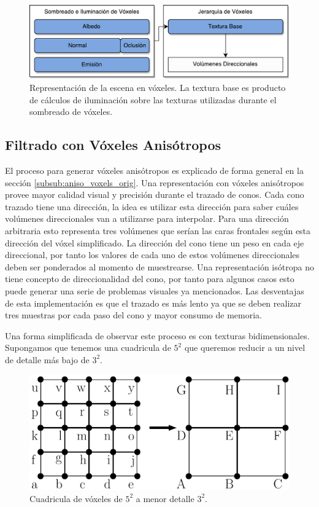 \begin{figure}[H]
    \centering
    \includegraphics[width=.8\linewidth]{media/representation.pdf}
    \caption{Representación de la escena en vóxeles. La textura base es producto de cálculos de iluminación sobre las texturas utilizadas durante el sombreado de vóxeles.}
\end{figure}
\subsection{Filtrado con Vóxeles Anisótropos} %
\label{sub:voxeles_anisotropos}
El proceso para generar vóxeles anisótropos es explicado de forma general en la sección \ref{subsub:aniso_voxels_orig}. Una representación con vóxeles anisótropos provee mayor calidad visual y precisión durante el trazado de conos. Cada cono trazado tiene una dirección, la idea es utilizar esta dirección para saber cuáles volúmenes direccionales van a utilizarse para interpolar. Para una dirección arbitraria esto representa tres volúmenes que serían las caras frontales según esta dirección del vóxel simplificado. La dirección del cono tiene un peso en cada eje direccional, por tanto los valores de cada uno de estos volúmenes direccionales deben ser ponderados al momento de muestrearse. Una representación isótropa no tiene concepto de direccionalidad del cono, por tanto para algunos casos esto puede generar una serie de problemas visuales ya mencionados. Las desventajas de esta implementación es que el trazado es más lento ya que se deben realizar tres muestras por cada paso del cono y mayor consumo de memoria.

Una forma simplificada de observar este proceso es con texturas bidimensionales. Supongamos que tenemos una cuadricula de $5^2$ que queremos reducir a un nivel de detalle más bajo de $3^2$.

\begin{figure}[H]
    \centering
    \includegraphics[width=.5\linewidth]{media/filtering_1.pdf}
    \caption{Cuadricula de vóxeles de $5^2$ a menor detalle $3^2$.}
\end{figure}

